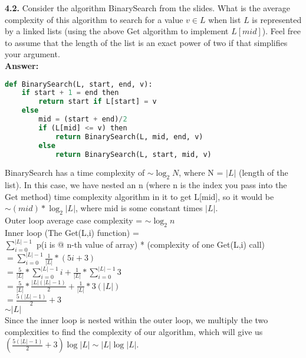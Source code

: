 \documentclass{article}
\begin{document}
\noindent
\textbf{4.2.} Consider the algorithm BinarySearch from the slides. What is the average complexity of this algorithm to search for a value $v \in L$  when list $L$ is represented by a linked lists (using the above Get algorithm to implement $L[mid]$). Feel free to assume that the length of the list is an exact power of two if that simplifies your argument.\\

\noindent \textbf{Answer: }

\begin{lstlisting}[language=Python]
def BinarySearch(L, start, end, v):
    if start + 1 = end then
        return start if L[start] = v
    else
        mid = (start + end)/2
        if (L[mid] <= v) then
            return BinarySearch(L, mid, end, v)
        else
            return BinarySearch(L, start, mid, v)
\end{lstlisting}

BinarySearch has a time complexity of $\sim \log_2N$, where N = $|L|$ (length of the list). In this case, we have nested 
an n (where n is the index you pass into the Get method) time complexity algorithm in it to get L[mid], so it would be 
$\sim (mid)*\log_2|L|$, where mid is some constant times $|L|$.\\

\noindent Outer loop average case complexity = $\sim \log_2n$\\
\noindent Inner loop (The Get(L,i) function) = \\
\vspace*{5pt}$ \sum_{i=0}^{|L|-1} $ p(i is @ n-th value of array) * (complexity of one Get(L,i) call)\\
\vspace*{5pt}$ = \sum_{i=0}^{|L|-1} \frac{1}{|L|} * (5i + 3)$\\
\vspace*{5pt}$ = \frac{5}{|L|}*\sum_{i=0}^{|L|-1}i + \frac{1}{|L|}*\sum_{i=0}^{|L|-1}3$\\
\vspace*{5pt}$ = \frac{5}{|L|}*\frac{|L|(|L|-1)}{2} + \frac{1}{|L|}*3(|L|)$\\
\vspace*{5pt}$ = \frac{5(|L|-1)}{2} + 3$\\
\vspace*{5pt}$ \sim |L|$\\

Since the inner loop is nested within the outer loop, we multiply the two complexities to find the complexity of our algorithm, which will give us 
$(\frac{5(|L|-1)}{2} + 3)\log|L| \sim |L|\log|L|$.
\end{document}
